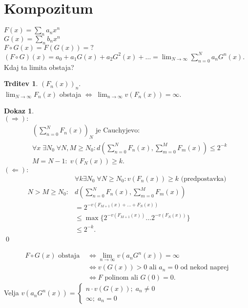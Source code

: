 \documentclass[a4paper, 12pt]{book}
\theoremstyle{definition}
\newtheorem{claim}[counter]{Trditev}
\newtheorem{pro}[counter]{Dokaz}
\theoremstyle{remark}
\begin{document}
\section{Kompozitum}

$F(x) = \sum_n a_n x^n$ \\
$G(x) = \sum_n b_n x^n$ \\
$F \circ G(x) = F(G(x)) = ?$ \\
$(F \circ G)(x) = a_0 + a_1 G(x) + a_2 G^2(x) + \dots = \lim_{N \to \infty} \sum_{n=0}^{N} a_n G^n(x)$. \\
Kdaj ta limita obstaja?
\begin{claim}
  $(F_n(x))_n$. \\
  $\lim_{N \to \infty} F_n(x)$ obstaja $\iff \; \lim_{n \to \infty} v\left(F_n(x)\right) = \infty$.
\end{claim}
\begin{pro} \text{} \\
  $(\Longrightarrow):$
  \begin{align*}
    &\left(\sum_{n=0}^{N} F_n(x)\right)_N \text{ je Cauchyjevo}: \\
    &\forall x \; \exists N_0 \; \forall N,M \geq N_0: d\left(\sum_{n=0}^{N} F_n(x), \sum_{m=0}^{M} F_m(x)\right) \leq 2^{-k} \\
    &M = N-1: \; v\left(F_N(x)\right) \geq k.
  \end{align*}
  $(\Longleftarrow):$
  \begin{align*}
    &\forall k \exists N_0 \; \forall N \geq N_0: v\left(F_n(x)\right) \geq k \text{ (predpostavka)} \\
    N > M \geq N_0: &d\left(\sum_{n=0}^{N} F_n(x), \sum_{m=0}^{M} F_m(x)\right) \\
    &= 2^{-v(F_{M+1}(x) + \dots + F_N(x))} \\
    &\leq \max \{2^{-v(F_{M+1}(x))} \dots 2^{-v(F_N(x))}\} \\
    &\leq 2^{-k}.
  \end{align*}
  \qed
\end{pro}
\begin{align*}
  F \circ G(x) \text{ obstaja } &\iff \lim_{n \to \infty} v\left(a_n G^n(x)\right) = \infty \\
  &\iff v(G(x)) > 0 \text{ ali } a_n = 0 \text{ od nekod naprej} \\
  &\iff F \text{ polinom ali } G(0) = 0.
\end{align*}
Velja $v\left(a_n G^n(x)\right) = \begin{cases}
  n \cdot v(G(x)); \; a_n \neq 0 \\
  \infty; \; a_n = 0
\end{cases}$
\end{document}
